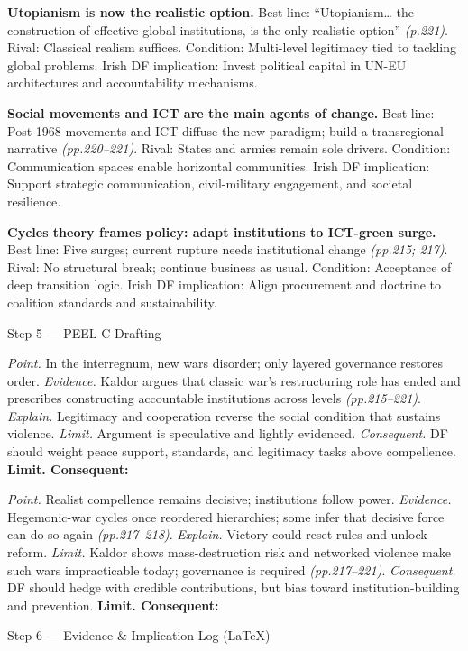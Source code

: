 \textbf{Utopianism is now the realistic option.}
Best line: “Utopianism… the construction of effective global institutions, is the only realistic option” \emph{(p.221)}. Rival: Classical realism suffices. Condition: Multi-level legitimacy tied to tackling global problems. Irish DF implication: Invest political capital in UN-EU architectures and accountability mechanisms.

\textbf{Social movements and ICT are the main agents of change.}
Best line: Post-1968 movements and ICT diffuse the new paradigm; build a transregional narrative \emph{(pp.220–221)}. Rival: States and armies remain sole drivers. Condition: Communication spaces enable horizontal communities. Irish DF implication: Support strategic communication, civil-military engagement, and societal resilience.

\textbf{Cycles theory frames policy: adapt institutions to ICT-green surge.}
Best line: Five surges; current rupture needs institutional change \emph{(pp.215; 217)}. Rival: No structural break; continue business as usual. Condition: Acceptance of deep transition logic. Irish DF implication: Align procurement and doctrine to coalition standards and sustainability.

Step 5 — PEEL-C Drafting

\textit{Point.} In the interregnum, new wars disorder; only layered governance restores order.
\textit{Evidence.} Kaldor argues that classic war’s restructuring role has ended and prescribes constructing accountable institutions across levels \emph{(pp.215–221)}.
\textit{Explain.} Legitimacy and cooperation reverse the social condition that sustains violence.
\textit{Limit.} Argument is speculative and lightly evidenced.
\textit{Consequent.} DF should weight peace support, standards, and legitimacy tasks above compellence. \textbf{Limit. Consequent:}

\textit{Point.} Realist compellence remains decisive; institutions follow power.
\textit{Evidence.} Hegemonic-war cycles once reordered hierarchies; some infer that decisive force can do so again \emph{(pp.217–218)}.
\textit{Explain.} Victory could reset rules and unlock reform.
\textit{Limit.} Kaldor shows mass-destruction risk and networked violence make such wars impracticable today; governance is required \emph{(pp.217–221)}.
\textit{Consequent.} DF should hedge with credible contributions, but bias toward institution-building and prevention. \textbf{Limit. Consequent:}

Step 6 — Evidence & Implication Log (LaTeX)

